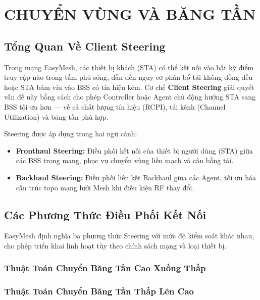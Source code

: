 \chapter{CHUYỂN VÙNG VÀ BĂNG TẦN}
\label{chapter:chapter-7}

\section{Tổng Quan Về Client Steering}

Trong mạng EasyMesh, các thiết bị khách (STA) có thể kết nối vào bất kỳ điểm truy cập
nào trong tầm phủ sóng, dẫn đến nguy cơ phân bổ tải không đồng đều hoặc STA bám víu
vào BSS có tín hiệu kém. Cơ chế \textbf{Client Steering} giải quyết vấn đề này bằng
cách cho phép Controller hoặc Agent chủ động hướng STA sang BSS tối ưu hơn --- về cả
chất lượng tín hiệu (RCPI), tải kênh (Channel Utilization) và băng tần phù hợp.

Steering được áp dụng trong hai ngữ cảnh:
\begin{itemize}
	\item \textbf{Fronthaul Steering:} Điều phối kết nối của thiết bị người dùng (STA)
	giữa các BSS trong mạng, phục vụ chuyển vùng liền mạch và cân bằng tải.
	\item \textbf{Backhaul Steering:} Điều phối liên kết Backhaul giữa các Agent,
	tối ưu hóa cấu trúc topo mạng lưới Mesh khi điều kiện RF thay đổi.
\end{itemize}


\section{Các Phương Thức Điều Phối Kết Nối}

EasyMesh định nghĩa ba phương thức Steering với mức độ kiểm soát khác nhau, cho phép
triển khai linh hoạt tùy theo chính sách mạng và loại thiết bị.

\subsection{Thuật Toán Chuyển Băng Tần Cao Xuống Thấp}

\subsection{Thuật Toán Chuyển Băng Tần Thấp Lên Cao}

